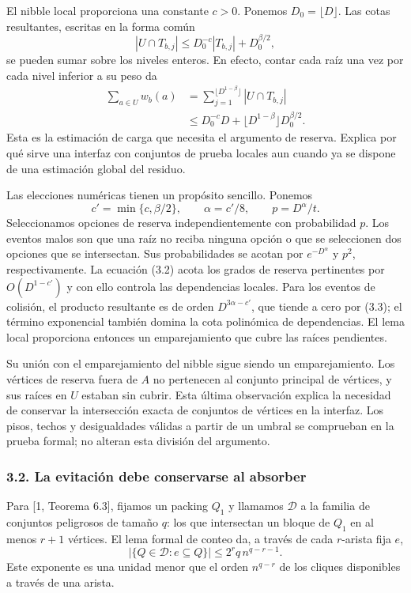 \documentclass[spanish,11pt,a4paper]{article}
\begin{document}
El nibble local proporciona una constante \(c>0\). Ponemos \(D_0=\lfloor D\rfloor\). Las cotas resultantes, escritas en la forma común \[|U\cap T_{b,j}|
\le D_0^{-c}|T_{b,j}|+D_0^{\beta/2},\] se pueden sumar sobre los niveles enteros. En efecto, contar cada raíz una vez por cada nivel inferior a su peso da \[\begin{aligned}
\sum_{a\in U}w_b(a)
&=\sum_{j=1}^{\lfloor D^{1-\beta}\rfloor}|U\cap T_{b,j}|\\
&\le D_0^{-c}D+
 \lfloor D^{1-\beta}\rfloor D_0^{\beta/2}.
\end{aligned}
\tag{3.2}\] Esta es la estimación de carga que necesita el argumento de reserva. Explica por qué sirve una interfaz con conjuntos de prueba locales aun cuando ya se dispone de una estimación global del residuo.

Las elecciones numéricas tienen un propósito sencillo. Ponemos \[c'=\min\{c,\beta/2\},\qquad
\alpha=c'/8,\qquad p=D^\alpha/t.
\tag{3.3}\] Seleccionamos opciones de reserva independientemente con probabilidad \(p\). Los eventos malos son que una raíz no reciba ninguna opción o que se seleccionen dos opciones que se intersectan. Sus probabilidades se acotan por \(e^{-D^\alpha}\) y \(p^2\), respectivamente. La ecuación (3.2) acota los grados de reserva pertinentes por \(O(D^{1-c'})\) y con ello controla las dependencias locales. Para los eventos de colisión, el producto resultante es de orden \(D^{3\alpha-c'}\), que tiende a cero por (3.3); el término exponencial también domina la cota polinómica de dependencias. El lema local proporciona entonces un emparejamiento que cubre las raíces pendientes.

Su unión con el emparejamiento del nibble sigue siendo un emparejamiento. Los vértices de reserva fuera de \(A\) no pertenecen al conjunto principal de vértices, y sus raíces en \(U\) estaban sin cubrir. Esta última observación explica la necesidad de conservar la intersección exacta de conjuntos de vértices en la interfaz. Los pisos, techos y desigualdades válidas a partir de un umbral se comprueban en la prueba formal; no alteran esta división del argumento.


\subsubsection{3.2. La evitación debe conservarse al absorber}\label{la-evitaciuxf3n-debe-conservarse-al-absorber}

Para {[}1, Teorema 6.3{]}, fijamos un packing \(Q_1\) y llamamos \(\mathcal D\) a la familia de conjuntos peligrosos de tamaño \(q\): los que intersectan un bloque de \(Q_1\) en al menos \(r+1\) vértices. El lema formal de conteo da, a través de cada \(r\)-arista fija \(e\), \[|\{Q\in\mathcal D:e\subseteq Q\}|
\le 2^r q\,n^{q-r-1}.
\tag{3.4}\] Este exponente es una unidad menor que el orden \(n^{q-r}\) de los cliques disponibles a través de una arista.
\end{document}
